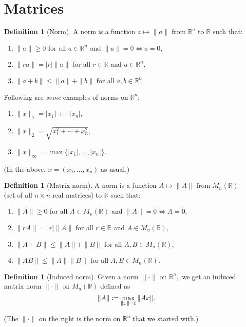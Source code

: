 \documentclass[12pt]{article}
\theoremstyle{definition}
\newtheorem{defn}[thm]{Definition}
\newcommand{\md}[1]{{\left\lvert #1 \right\lvert}}
\begin{document}
\section{Matrices}
\begin{defn}[Norm]
	A norm is a function $a \mapsto \|a\|$ from $\mathbb{R}^n$ to $\mathbb{R}$ such that:
	\begin{enumerate}
		\item $\|a\| \ge 0$ for all $a \in \mathbb{R}^n$ and $\|a\| = 0 \iff a = 0,$
		\item $\|ra\| = \md{r} \|a\|$ for all $r \in \mathbb{R}$ and $a \in \mathbb{R}^n,$
		\item $\|a + b\| \le \|a\| + \|b\|$ for all $a, b \in \mathbb{R}^n.$
	\end{enumerate}
\end{defn}

Following are \emph{some} examples of norms on $\mathbb{R}^n:$
\begin{enumerate}
	\item $\|x\|_1 = \md{x_1} + \cdots \md{x_n},$
	\item $\|x\|_2 = \sqrt{x_1^2 + \cdots + x_n^2},$
	\item $\|x\|_{\infty} = \max\{\md{x_1}, \ldots, \md{x_n}\}.$
\end{enumerate}
(In the above, $x = (x_1, \ldots, x_n)$ as usual.)

\begin{defn}[Matrix norm]
	A norm is a function $A \mapsto \|A\|$ from $M_n(\mathbb{R})$ (set of all $n \times n$ real matrices) to $\mathbb{R}$ such that:
	\begin{enumerate}
		\item $\|A\| \ge 0$ for all $A \in M_n(\mathbb{R})$ and $\|A\| = 0 \iff A = 0,$
		\item $\|rA\| = \md{r} \|A\|$ for all $r \in \mathbb{R}$ and $A \in M_n(\mathbb{R}),$
		\item $\|A + B\| \le \|A\| + \|B\|$ for all $A, B \in M_n(\mathbb{R}),$
		\item $\|AB\| \le \|A\| \|B\|$ for all $A, B \in M_n(\mathbb{R}).$
	\end{enumerate}
\end{defn}

\begin{defn}[Induced norm]
	Given a norm $\|\cdot\|$ on $\mathbb{R}^n,$ we get an induced matrix norm $\|\cdot\|$ on $M_n(\mathbb{R})$ defined as
	\begin{equation*} 
		\|A\| \vcentcolon= \max_{\|x\| = 1}\|Ax\|.
	\end{equation*}
\end{defn}
(The $\|\cdot\|$ on the right is the norm on $\mathbb{R}^n$ that we started with.)
\end{document}
